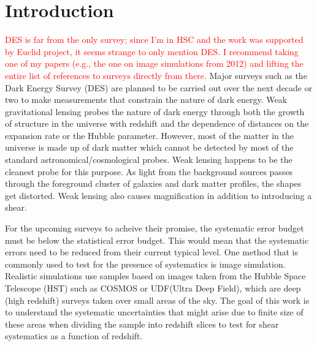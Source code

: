 \documentclass[twocolumn,useAMS,usenatbib]{mn2e}
\newcommand{\rachel}[1]{{\textcolor{red}{#1}}}
\begin{document}
\section{Introduction}
\label{S:intro}

\rachel{DES is far from the only survey; since I'm in HSC and the work was supported by Euclid project, it seems strange to only mention DES.  I recommend taking one of my papers (e.g., the one on image simulations from 2012) and lifting the entire list of references to surveys directly from there.}
Major surveys such as the Dark Energy Survey (DES) are planned to be carried out over the next decade or two to make measurements that constrain the nature of dark energy.
Weak gravitational lensing probes the nature of dark energy through both the growth of structure in the universe with redshift and the dependence of distances on the expansion rate or the Hubble parameter.
However, most of the matter in the universe is made up of dark matter which cannot be detected by most of the standard astronomical/cosmological probes. Weak lensing happens to be the cleanest probe for this purpose.
As light from the background sources passes through the foreground cluster of galaxies and dark matter profiles, the shapes get distorted. Weak lensing also causes magnification in addition to introducing a shear.

For the upcoming surveys to acheive their promise, the systematic error budget must be below the statistical error budget. This would mean that the systematic errors need to be reduced from their current typical level.
One method that is commonly used to test for the presence of systematics is image simulation. Realistic simulations use samples based on images taken from the Hubble Space Telescope (HST) such as COSMOS or UDF(Ultra Deep Field), which are deep (high redshift) surveys taken over small areas of the sky.
The goal of this work is to understand the systematic uncertainties that might arise due to finite size of these areas when dividing the sample into redshift slices to test for 
shear systematics as a function of redshift.
\end{document}
